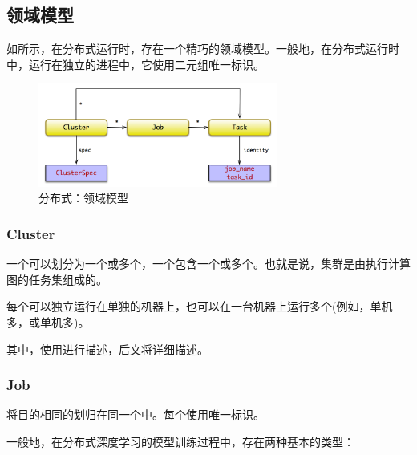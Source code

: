 \begin{content}
\subsection{领域模型}

如所示，在\tf{}分布式运行时，存在一个精巧的领域模型。一般地，在分布式运行时中，运行在独立的进程中，它使用二元组唯一标识。

\begin{figure}[H]
\centering
\includegraphics[width=0.7\textwidth]{figures/cc-dist-model.png}
\caption{分布式：领域模型}
 \label{fig:cc-dist-model}
\end{figure}

\subsubsection{Cluster}

一个可以划分为一个或多个，一个包含一个或多个。也就是说，集群是由执行计算图的任务集组成的。

每个可以独立运行在单独的机器上，也可以在一台机器上运行多个(例如，单机多，或单机多)。

其中，使用进行描述，后文将详细描述。

\subsubsection{Job}

将目的相同的划归在同一个中。每个使用唯一标识。

一般地，在分布式深度学习的模型训练过程中，存在两种基本的类型：

\begin{enum}
\end{enum}


\end{content}
